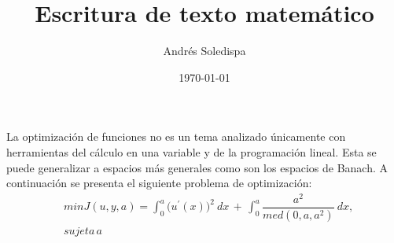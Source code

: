 \documentclass[a4paper,12pt]{article}
\author{Andrés Soledispa}
\title{Escritura de texto matemático}
\date{\today}
\begin{document}
\maketitle
La optimización de funciones no es un tema analizado únicamente con herramientas del cálculo en
una variable y de la programación lineal. Esta se puede generalizar a espacios más generales como
son los espacios de Banach. A continuación se presenta el siguiente problema de optimización:
\begin{align}
&min J(u,y,a)=\int_{0}^{a} \big(u^{'}(x)\big)^{2}\ dx \,+\,\int_{0}^{a} \dfrac{a^2}{med(0,a,a^2)} \ dx , \\
\nonumber&sujeta \,a\nonumber 

\end{align}
\end{document}

